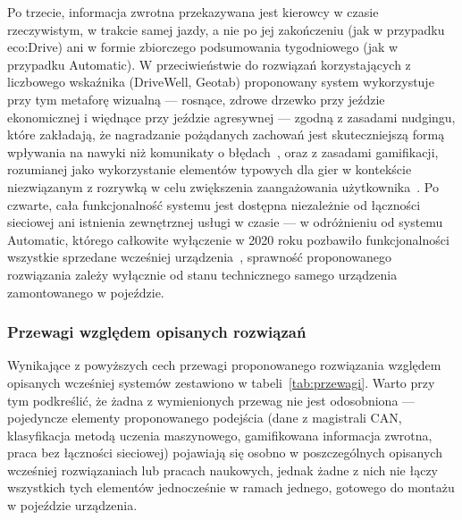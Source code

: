 Po trzecie, informacja zwrotna przekazywana jest kierowcy w czasie rzeczywistym, w
trakcie samej jazdy, a nie po jej zakończeniu (jak w przypadku eco:Drive) ani w formie
zbiorczego podsumowania tygodniowego (jak w przypadku Automatic). W przeciwieństwie do
rozwiązań korzystających z liczbowego wskaźnika (DriveWell, Geotab) proponowany system
wykorzystuje przy tym metaforę wizualną --- rosnące, zdrowe drzewko przy jeździe
ekonomicznej i więdnące przy jeździe agresywnej --- zgodną z zasadami nudgingu, które
zakładają, że nagradzanie pożądanych zachowań jest skuteczniejszą formą wpływania na
nawyki niż komunikaty o błędach~\cite{thaler2008}, oraz z zasadami gamifikacji, rozumianej
jako wykorzystanie elementów typowych dla gier w kontekście niezwiązanym z rozrywką w
celu zwiększenia zaangażowania użytkownika~\cite{deterding2011}. Po czwarte, cała
funkcjonalność systemu jest dostępna niezależnie od łączności sieciowej ani istnienia
zewnętrznej usługi w czasie --- w odróżnieniu od systemu Automatic, którego całkowite
wyłączenie w 2020 roku pozbawiło funkcjonalności wszystkie sprzedane wcześniej
urządzenia~\cite{automaticlabs}, sprawność proponowanego rozwiązania zależy wyłącznie od
stanu technicznego samego urządzenia zamontowanego w pojeździe.

\subsubsection{Przewagi względem opisanych rozwiązań}

Wynikające z powyższych cech przewagi proponowanego rozwiązania względem opisanych
wcześniej systemów zestawiono w tabeli~\ref{tab:przewagi}. Warto przy tym podkreślić, że
żadna z wymienionych przewag nie jest odosobniona --- pojedyncze elementy proponowanego
podejścia (dane z magistrali CAN, klasyfikacja metodą uczenia maszynowego, gamifikowana
informacja zwrotna, praca bez łączności sieciowej) pojawiają się osobno w
poszczególnych opisanych wcześniej rozwiązaniach lub pracach naukowych, jednak żadne
z nich nie łączy wszystkich tych elementów jednocześnie w ramach jednego, gotowego do
montażu w pojeździe urządzenia.

